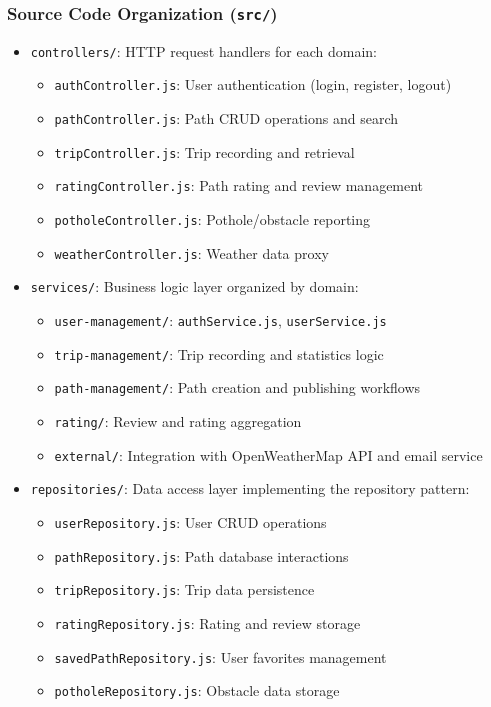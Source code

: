 \subsubsection{Source Code Organization (\texttt{src/})}
\begin{itemize}
    \item \texttt{controllers/}: HTTP request handlers for each domain:
    \begin{itemize}
        \item \texttt{authController.js}: User authentication (login, register, logout)
        \item \texttt{pathController.js}: Path CRUD operations and search
        \item \texttt{tripController.js}: Trip recording and retrieval
        \item \texttt{ratingController.js}: Path rating and review management
        \item \texttt{potholeController.js}: Pothole/obstacle reporting
        \item \texttt{weatherController.js}: Weather data proxy
    \end{itemize}
    
    \item \texttt{services/}: Business logic layer organized by domain:
    \begin{itemize}
        \item \texttt{user-management/}: \texttt{authService.js}, \texttt{userService.js}
        \item \texttt{trip-management/}: Trip recording and statistics logic
        \item \texttt{path-management/}: Path creation and publishing workflows
        \item \texttt{rating/}: Review and rating aggregation
        \item \texttt{external/}: Integration with OpenWeatherMap API and email service
    \end{itemize}
    
    \item \texttt{repositories/}: Data access layer implementing the repository pattern:
    \begin{itemize}
        \item \texttt{userRepository.js}: User CRUD operations
        \item \texttt{pathRepository.js}: Path database interactions
        \item \texttt{tripRepository.js}: Trip data persistence
        \item \texttt{ratingRepository.js}: Rating and review storage
        \item \texttt{savedPathRepository.js}: User favorites management
        \item \texttt{potholeRepository.js}: Obstacle data storage
    \end{itemize}
    

\end{itemize}
